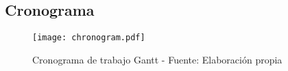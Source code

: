 \subsection{Cronograma}
\begin{landscape}
\centering
	\begin{figure}
        \caption{Cronograma de trabajo Gantt - Fuente: Elaboración propia} \label{fig:chronogram}
		\texttt{[image: chronogram.pdf]}
	\end{figure}
\end{landscape}

